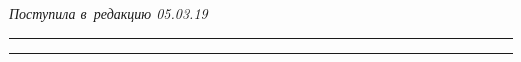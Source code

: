 \vspace*{-3pt}





\hfill{\small\textit{Поступила в~редакцию 05.03.19}}














\vspace*{6pt}





\hrule





\vspace*{2pt}















\hrule
















\def\tit{INTELLECTUALIZATION OF OPERATIONAL DISPATCH CONTROL OF~COMPLEX REGIONAL 


DYNAMIC POWER SYSTEM}





\def\titkol{Intellectualization of operational dispatch control of~complex regional 


dynamic power system}








\def\aut{A.\,V.~Kolesnikov$^{1,2}$, S.\,V.~Listopad$^2$, and~F.\,G.~Maitakov$^1$}


\def\autkol{A.\,V.~Kolesnikov, S.\,V.~Listopad, and~F.\,G.~Maitakov}











